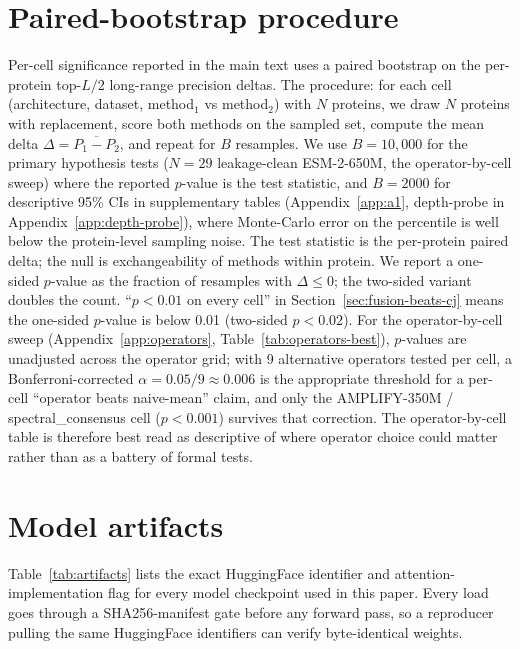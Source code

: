 \documentclass{article}
\begin{document}
\section{Paired-bootstrap procedure}
\label{app:bootstrap}

Per-cell significance reported in the main text uses a paired
bootstrap on the per-protein top-$L/2$ long-range precision
deltas. The procedure: for each cell (architecture, dataset,
method$_1$ vs method$_2$) with $N$ proteins, we draw $N$ proteins
with replacement, score both methods on the sampled set, compute
the mean delta $\Delta = \overline{P_1 - P_2}$, and repeat for $B$
resamples. We use $B{=}10{,}000$ for the primary hypothesis tests
($N{=}29$ leakage-clean ESM-2-650M, the operator-by-cell sweep)
where the reported $p$-value is the test statistic, and $B{=}2000$
for descriptive 95\% CIs in supplementary tables
(Appendix~\ref{app:a1}, depth-probe in
Appendix~\ref{app:depth-probe}), where Monte-Carlo error on the
percentile is well below the protein-level sampling noise. The
test statistic is the per-protein paired delta; the null is
exchangeability of methods within protein. We report a one-sided
$p$-value as the fraction of resamples with $\Delta \leq 0$; the
two-sided variant doubles the count.
``$p<0.01$ on every cell'' in Section~\ref{sec:fusion-beats-cj}
means the one-sided $p$-value is below 0.01 (two-sided $p<0.02$).
For the operator-by-cell sweep (Appendix~\ref{app:operators},
Table~\ref{tab:operators-best}), $p$-values are unadjusted across
the operator grid; with 9 alternative operators tested per cell,
a Bonferroni-corrected $\alpha{=}0.05/9 \approx 0.006$ is the
appropriate threshold for a per-cell ``operator beats naive-mean''
claim, and only the AMPLIFY-350M / spectral\_consensus cell
($p{<}0.001$) survives that correction. The operator-by-cell
table is therefore best read as descriptive of where operator
choice could matter rather than as a battery of formal tests.

\section{Model artifacts}
\label{app:artifacts}

Table~\ref{tab:artifacts} lists the exact HuggingFace identifier and
attention-implementation flag for every model checkpoint used in
this paper. Every load goes through a SHA256-manifest gate before
any forward pass, so a reproducer pulling the same HuggingFace
identifiers can verify byte-identical weights.
\end{document}
